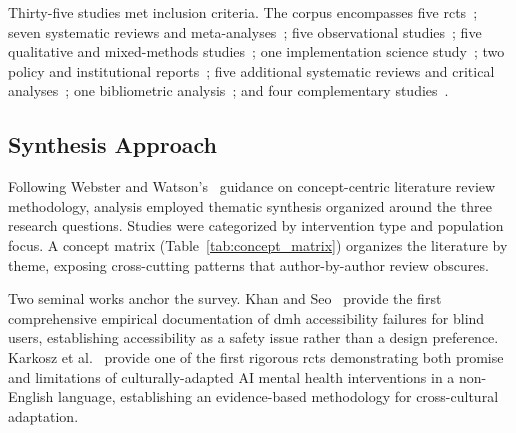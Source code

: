 Thirty-five studies met inclusion criteria. The corpus encompasses five \gls{rct}s~\cite{he_2022,karkosz_2024,liu_2023,meheli_2022,rollwage_2024}; seven systematic reviews and meta-analyses~\cite{abd_alrazaq_2020,casu_2024,dehbozorgi_2025,li_2023,liu_2023,omar_2025,haider_2024}; five observational studies~\cite{de_freitas_2024,drydakis_2022,khan_seo_2025,tanni_2024,papadopoulos_2025}; five qualitative and mixed-methods studies~\cite{aleem_2024,fowler_2023,naderbagi_2024,soubutts_2024,killian_2023}; one implementation science study~\cite{smith_2023}; two policy and institutional reports~\cite{apa_2025,who_2025}; five additional systematic reviews and critical analyses~\cite{lawrence_2024,meadi_2025,pfohl_2024,timmons_2023,robinson_2024}; one bibliometric analysis~\cite{zhang_bibliometric_2025}; and four complementary studies~\cite{huang_2024,palmer_2025,straw_2020,dehghani_2024}.

\subsection{Synthesis Approach}

Following Webster and Watson's~\cite{webster_watson_2002} guidance on concept-centric literature review methodology, analysis employed thematic synthesis organized around the three research questions. Studies were categorized by intervention type and population focus. A concept matrix (Table~\ref{tab:concept_matrix}) organizes the literature by theme, exposing cross-cutting patterns that author-by-author review obscures.

Two seminal works anchor the survey. Khan and Seo~\cite{khan_seo_2025} provide the first comprehensive empirical documentation of \gls{dmh} accessibility failures for blind users, establishing accessibility as a safety issue rather than a design preference. Karkosz et al.~\cite{karkosz_2024} provide one of the first rigorous \gls{rct}s demonstrating both promise and limitations of culturally-adapted AI mental health interventions in a non-English language, establishing an evidence-based methodology for cross-cultural adaptation.
